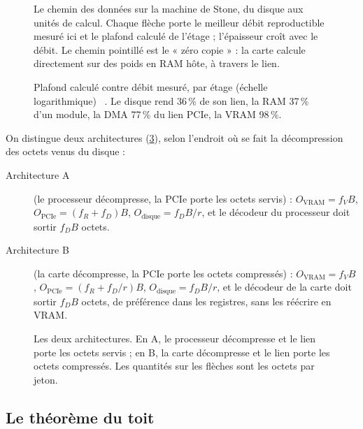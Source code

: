\begin{figure}[p]
\centering
\SchemaChemin
\caption[Le chemin des données, du disque aux unités de calcul]{Le chemin des données sur la machine de Stone, du disque aux unités de calcul. Chaque flèche porte le meilleur débit reproductible mesuré ici et le plafond calculé de l'étage ; l'épaisseur croît avec le débit. Le chemin pointillé est le « zéro copie » : la carte calcule directement sur des poids en RAM hôte, à travers le lien.}
\label{fig:chemin}
\end{figure}

\begin{figure}[ht]
\centering
\GrapheEtages
\caption[Plafond calculé contre débit mesuré, par étage]{Plafond calculé contre débit mesuré, par étage (échelle logarithmique) \mes~\calc. Le disque rend 36\,\% de son lien, la RAM 37\,\% d'un module, la DMA 77\,\% du lien PCIe, la VRAM 98\,\%.}
\label{fig:etages}
\end{figure}

On distingue deux architectures (\cref{fig:architectures}), selon l'endroit où se fait la décompression des octets venus du disque :
\begin{description}
\item[Architecture A] (le processeur décompresse, la PCIe porte les octets servis) :
$O_{\mathrm{VRAM}} = f_V B$, $O_{\mathrm{PCIe}} = (f_R + f_D) B$, $O_{\mathrm{disque}} = f_D B / r$, et le décodeur du processeur doit sortir $f_D B$ octets.
\item[Architecture B] (la carte décompresse, la PCIe porte les octets compressés) :
$O_{\mathrm{VRAM}} = f_V B$, $O_{\mathrm{PCIe}} = (f_R + f_D/r) B$, $O_{\mathrm{disque}} = f_D B / r$, et le décodeur de la carte doit sortir $f_D B$ octets, de préférence dans les registres, sans les réécrire en VRAM.
\end{description}

\begin{figure}[ht]
\centering
\SchemaArchitectures
\caption[Architectures A et B]{Les deux architectures. En A, le processeur décompresse et le lien porte les octets servis ; en B, la carte décompresse et le lien porte les octets compressés. Les quantités sur les flèches sont les octets par jeton.}
\label{fig:architectures}
\end{figure}

\subsection{Le théorème du toit}

